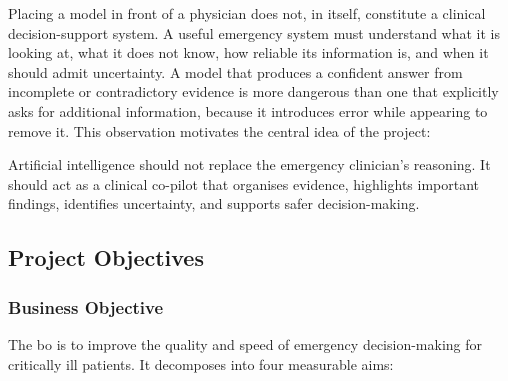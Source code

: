 Placing a model in front of a physician does not, in itself, constitute a clinical
decision-support system. A useful emergency system must understand what it is looking at,
what it does not know, how reliable its information is, and when it should admit
uncertainty. A model that produces a confident answer from incomplete or contradictory
evidence is more dangerous than one that explicitly asks for additional information,
because it introduces error while appearing to remove it. This observation motivates the
central idea of the project:

\begin{keystatement}
Artificial intelligence should not replace the emergency clinician's reasoning. It should
act as a clinical co-pilot that organises evidence, highlights important findings,
identifies uncertainty, and supports safer decision-making.
\end{keystatement}

\subsection{Project Objectives}
\label{subsec:objectives}

\subsubsection{Business Objective}

The \gls{bo} is to improve the quality and speed of emergency decision-making for
critically ill patients. It decomposes into four measurable aims:

